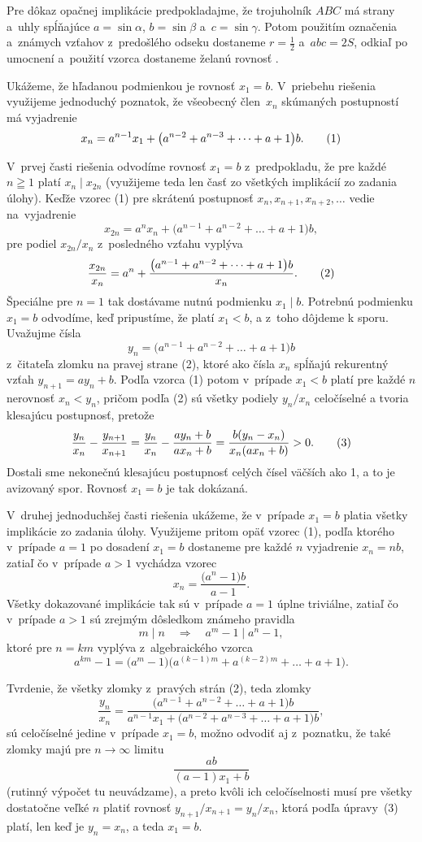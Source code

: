 {Pre dôkaz opačnej implikácie predpokladajme, že trojuholník $ABC$ má strany a~uhly spĺňajúce $a=\sin\alpha$, $b=\sin\beta$ a~$c=\sin\gamma$. Potom použitím označenia a~známych vzťahov z~predošlého odseku dostaneme $r=\frac12$ a~$abc=2S$, odkiaľ po umocnení a~použití vzorca  dostaneme želanú rovnosť .

}

{%
Ukážeme, že hľadanou podmienkou je rovnosť $x_1=b$. V~priebehu
riešenia využijeme jednoduchý poznatok,
že všeobecný člen~$x_n$ skúmaných postupností má vyjadrenie
$$
x_n=a^{n-1}x_1+\bigl(a^{n-2}+a^{n-3}+\dots+a+1\bigr)b.
\tag1$$

V~prvej časti riešenia odvodíme rovnosť $x_1=b$ z~predpokladu,
že pre každé $n\geqq1$ platí $x_n\mid x_{2n}$ (využijeme teda len
časť zo všetkých implikácií zo zadania úlohy). Keďže vzorec (1) pre
skrátenú postupnosť $x_n,x_{n+1},x_{n+2},\dots$ vedie na~vyjadrenie
$$
x_{2n}=a^{n}x_n+\bigl(a^{n-1}+a^{n-2}+\dots+a+1\bigr)b,
$$
pre podiel $x_{2n}/x_n$ z~posledného vzťahu vyplýva
$$
\frac{x_{2n}}{x_n}=a^n+
\frac{\bigl(a^{n-1}+a^{n-2}+\dots+a+1\bigr)b}{x_n}.
\tag2$$
Špeciálne pre $n=1$ tak dostávame nutnú podmienku $x_1\mid b$.
Potrebnú podmienku $x_1=b$ odvodíme, keď pripustíme, že
platí $x_1<b$, a z~toho dôjdeme k sporu. Uvažujme čísla
$$
y_n=\bigl(a^{n-1}+a^{n-2}+\dots+a+1\bigr)b
$$
z~čitateľa zlomku na pravej strane (2), ktoré ako čísla $x_n$
spĺňajú rekurentný vzťah $y_{n+1}=ay_{n}+b$. Podľa vzorca (1)
potom v~prípade $x_1<b$ platí pre každé $n$ nerovnosť
$x_n<y_n$, pričom podľa (2) sú všetky podiely
$y_n/x_n$ celočíselné a tvoria klesajúcu postupnosť, pretože
$$
\frac{y_n}{x_n}-\frac{y_{n+1}}{x_{n+1}}=
\frac{y_n}{x_n}-\frac{ay_n+b}{ax_n+b}=
\frac{b(y_n-x_n)}{x_n(ax_n+b)}>0.
\tag3$$
Dostali sme nekonečnú klesajúcu postupnosť celých čísel
väčších ako 1, a to je avizovaný spor. Rovnosť $x_1=b$ je tak dokázaná.

\smallskip
V~druhej jednoduchšej časti riešenia ukážeme, že v~prípade $x_1=b$
platia všetky implikácie zo zadania úlohy. Využijeme pritom opäť
vzorec (1), podľa ktorého v~prípade $a=1$ po dosadení $x_1=b$
dostaneme pre každé $n$ vyjadrenie $x_n=nb$, zatiaľ čo v~prípade
$a>1$ vychádza vzorec
$$
x_n=\dfrac{\bigl(a^n-1\bigr)b}{a-1}.
$$
Všetky dokazované implikácie tak sú v~prípade $a=1$ úplne triviálne,
zatiaľ čo v~prípade $a>1$ sú zrejmým dôsledkom známeho pravidla
$$
m\mid n\quad\Longrightarrow\quad a^m-1\mid a^n-1,
$$
ktoré pre $n=km$ vyplýva z~algebraického vzorca
$$
a^{km}-1=\bigl(a^{m}-1\bigr)
\bigl(a^{(k-1)m}+a^{(k-2)m}+\dots+a+1\bigr).
$$

\poznamka
Tvrdenie, že všetky zlomky z~pravých strán (2),
teda zlomky
$$
\frac{y_n}{x_n}=
\frac{\bigl(a^{n-1}+a^{n-2}+\dots+a+1\bigr)b}
{a^{n-1}x_1+\bigl(a^{n-2}+a^{n-3}+\dots+a+1\bigr)b},
$$
sú celočíselné jedine v~prípade $x_1=b$, možno odvodiť aj
z~poznatku, že také zlomky majú pre $n\to\infty$ limitu
$$
\dfrac{ab}{(a-1)x_1+b}
$$
(rutinný výpočet tu neuvádzame),
a preto kvôli ich celočíselnosti musí
pre všetky dostatočne veľké $n$ platiť rovnosť
$y_{n+1}/x_{n+1}=y_n/x_n$, ktorá podľa úpravy~(3) platí, len keď
je $y_n=x_n$, a teda $x_1=b$.
}

